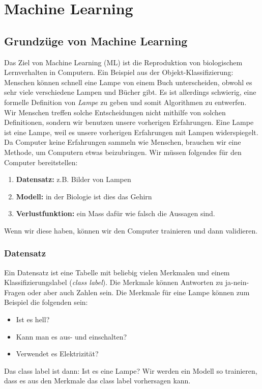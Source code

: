 \chapter{Machine Learning}

\section{Grundzüge von Machine Learning}
Das Ziel von Machine Learning (ML) ist die Reproduktion von biologischem Lernverhalten in Computern. 
Ein Beispiel aus der Objekt-Klassifizierung: Menschen können schnell eine Lampe von einem Buch unterscheiden, obwohl es sehr viele verschiedene Lampen und Bücher gibt. 
Es ist allerdings schwierig, eine formelle Definition von \textit{Lampe} zu geben und somit Algorithmen zu entwerfen. 
Wir Menschen treffen solche Entscheidungen nicht mithilfe von solchen Definitionen, sondern wir benutzen unsere vorherigen Erfahrungen. Eine Lampe ist eine Lampe, weil es unsere vorherigen Erfahrungen mit Lampen widerspiegelt.\\

Da Computer keine Erfahrungen sammeln wie Menschen, brauchen wir eine Methode, um Computern etwas beizubringen. 
Wir müssen folgendes für den Computer bereitstellen:
\begin{enumerate}
    \item \textbf{Datensatz: } z.B. Bilder von Lampen
    \item \textbf{Modell: } in der Biologie ist dies das Gehirn
    \item \textbf{Verlustfunktion: } ein Mass dafür wie falsch die Aussagen sind.
\end{enumerate}
Wenn wir diese haben, können wir den Computer trainieren und dann validieren. 

\subsection{Datensatz}
Ein Datensatz ist eine Tabelle mit beliebig vielen Merkmalen und einem Klassifizierungslabel (\textit{class label}). Die Merkmale können Antworten zu ja-nein-Fragen oder aber auch Zahlen sein. Die Merkmale für eine Lampe können zum Beispiel die folgenden sein:
\begin{itemize}
    \item Ist es hell?
    \item Kann man es aus- und einschalten?
    \item Verwendet es Elektrizität?
\end{itemize}
Das class label ist dann: Ist es eine Lampe?
Wir werden ein Modell so trainieren, dass es aus den Merkmale das class label vorhersagen kann. 

